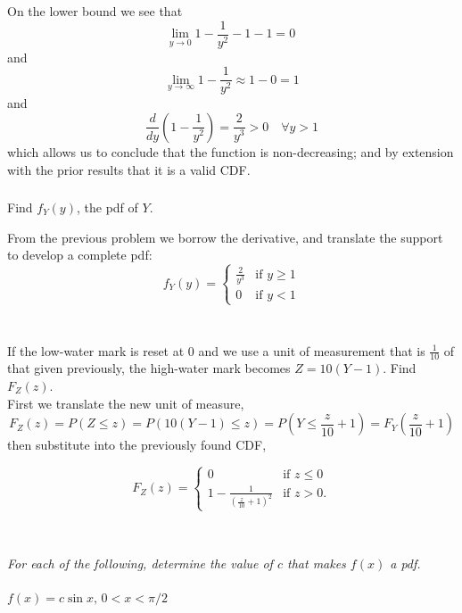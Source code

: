 \documentclass[12pt]{amsart}
\begin{document}
	On the lower bound we see that 
	\[ \lim\limits_{y\rightarrow0} 1-\frac{1}{y^2} - 1-1 = 0\ \]
	and
	\[ \lim\limits_{y\rightarrow\infty} 1-\frac{1}{y^2} \approx 1 -0 = 1 \]
	and
	\[ \frac{d}{dy} \left( 1-\frac{1}{y^2} \right) = \frac{2}{y^3} >0 \quad \forall y>1 \]
	which allows us to conclude that the function is non-decreasing; and by extension with the prior results that it is a valid CDF. \\
	
	\subsubsection{} Find \(f_Y(y)\), the pdf of \(Y\).
	
	From the previous problem we borrow the derivative, and translate the support to develop a complete pdf:
	\[ f_Y(y) = \begin{cases}
		\frac{2}{y^3} & \text{if } y \geq 1 \\
		0 & \text{if } y < 1
	\end{cases} \] \\
	
	\subsubsection{} If the low-water mark is reset at \(0\) and we use a unit of measurement that is $\frac{1}{10}$ of
		that given previously, the high-water mark becomes \(Z = 10(Y − 1)\). Find \(F_Z(z)\). \\
		
		
	First we translate the new unit of measure,
	\[F_Z(z) = P(Z\leq z) = P(10(Y-1)\leq z) = P(Y\leq\frac{z}{10}+1) = F_Y(\frac{z}{10}+1) \]
	then substitute into the previously found CDF,
		
	\[ F_Z(z) = \begin{cases}
		0 & \text{if } z \leq 0 \\
		1-\frac{1}{(\frac{z}{10}+1)^2} & \text{if } z > 0.
	\end{cases} \] \\

\subsection{} %
\textit{For each of the following, determine the value of $c$ that makes $f(x)$ a pdf.}
	\subsubsection{}
	\( f(x) = c\sin x,\, 0<x<\pi/2 \) \\
	
\end{document}
